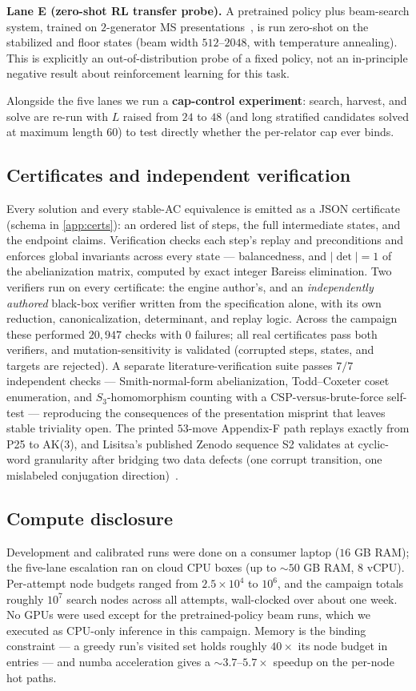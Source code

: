 \textbf{Lane E (zero-shot RL transfer probe).} A pretrained policy plus beam-search system,
trained on $2$-generator MS presentations~\cite{fagan2026twohump}, is run zero-shot on the
stabilized and floor states (beam width $512$--$2048$, with temperature annealing). This is
explicitly an out-of-distribution probe of a fixed policy, not an in-principle negative
result about reinforcement learning for this task.

Alongside the five lanes we run a \textbf{cap-control experiment}: search, harvest, and
solve are re-run with $L$ raised from $24$ to $48$ (and long stratified candidates solved
at maximum length $60$) to test directly whether the per-relator cap ever binds.

\subsection{Certificates and independent verification}

Every solution and every stable-AC equivalence is emitted as a JSON certificate (schema in
\ref{app:certs}): an ordered list of steps, the full intermediate states, and the endpoint
claims. Verification checks each step's replay and preconditions and enforces global
invariants across every state --- balancedness, and $|\det|=1$ of the abelianization matrix,
computed by exact integer Bareiss elimination. Two verifiers run on every certificate: the
engine author's, and an \emph{independently authored} black-box verifier written from the
specification alone, with its own reduction, canonicalization, determinant, and replay
logic. Across the campaign these performed $20{,}947$ checks with $0$ failures; all real
certificates pass both verifiers, and mutation-sensitivity is validated (corrupted steps,
states, and targets are rejected). A separate literature-verification suite passes $7/7$
independent checks --- Smith-normal-form abelianization, Todd--Coxeter coset enumeration, and
$S_3$-homomorphism counting with a CSP-versus-brute-force self-test --- reproducing the
consequences of the presentation misprint that leaves stable triviality open. The printed
$53$-move Appendix-F path replays exactly from P25 to AK(3), and Lisitsa's published Zenodo
sequence S2 validates at cyclic-word granularity after bridging two data defects (one
corrupt transition, one mislabeled conjugation direction)~\cite{lisitsa_zenodo}.

\subsection{Compute disclosure}

Development and calibrated runs were done on a consumer laptop ($16$ GB RAM); the five-lane
escalation ran on cloud CPU boxes (up to ${\sim}50$ GB RAM, $8$ vCPU). Per-attempt node
budgets ranged from $2.5\times10^4$ to $10^6$, and the campaign totals roughly $10^7$
search nodes across all attempts, wall-clocked over about one week. No GPUs were used
except for the pretrained-policy beam runs, which we executed as CPU-only inference in this
campaign. Memory is the binding constraint --- a greedy run's visited set holds roughly
$40\times$ its node budget in entries --- and numba acceleration gives a ${\sim}3.7$--$5.7\times$
speedup on the per-node hot paths.
